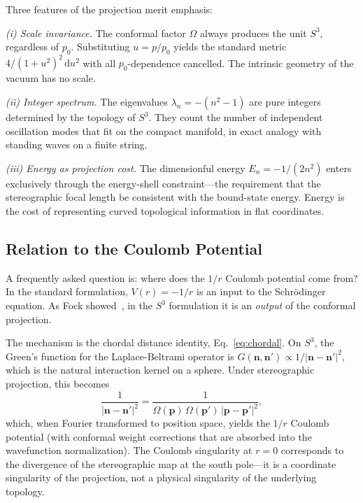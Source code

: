 \documentclass[aps,pra,twocolumn,superscriptaddress,longbibliography]{revtex4-2}
\begin{document}
Three features of the projection merit emphasis:

\textit{(i) Scale invariance.} The conformal factor $\Omega$ always produces the unit $S^3$, regardless of $p_0$. Substituting $u = p/p_0$ yields the standard metric $4/(1+u^2)^2\,\mathrm{d}u^2$ with all $p_0$-dependence cancelled. The intrinsic geometry of the vacuum has no scale.

\textit{(ii) Integer spectrum.} The eigenvalues $\lambda_n = -(n^2-1)$ are pure integers determined by the topology of $S^3$. They count the number of independent oscillation modes that fit on the compact manifold, in exact analogy with standing waves on a finite string.

\textit{(iii) Energy as projection cost.} The dimensionful energy $E_n = -1/(2n^2)$ enters exclusively through the energy-shell constraint---the requirement that the stereographic focal length be consistent with the bound-state energy. Energy is the cost of representing curved topological information in flat coordinates.

\subsection{Relation to the Coulomb Potential}

A frequently asked question is: where does the $1/r$ Coulomb potential come from? In the standard formulation, $V(r) = -1/r$ is an input to the Schr\"odinger equation. As Fock showed~\cite{fock1935}, in the $S^3$ formulation it is an \textit{output} of the conformal projection.

The mechanism is the chordal distance identity, Eq.~\eqref{eq:chordal}. On $S^3$, the Green's function for the Laplace-Beltrami operator is $G(\mathbf{n}, \mathbf{n}') \propto 1/|\mathbf{n} - \mathbf{n}'|^2$, which is the natural interaction kernel on a sphere. Under stereographic projection, this becomes
\begin{equation}
\frac{1}{|\mathbf{n} - \mathbf{n}'|^2} = \frac{1}{\Omega(\mathbf{p})\,\Omega(\mathbf{p}')\,|\mathbf{p} - \mathbf{p}'|^2},
\end{equation}
which, when Fourier transformed to position space, yields the $1/r$ Coulomb potential (with conformal weight corrections that are absorbed into the wavefunction normalization). The Coulomb singularity at $r = 0$ corresponds to the divergence of the stereographic map at the south pole---it is a coordinate singularity of the projection, not a physical singularity of the underlying topology.
\end{document}
